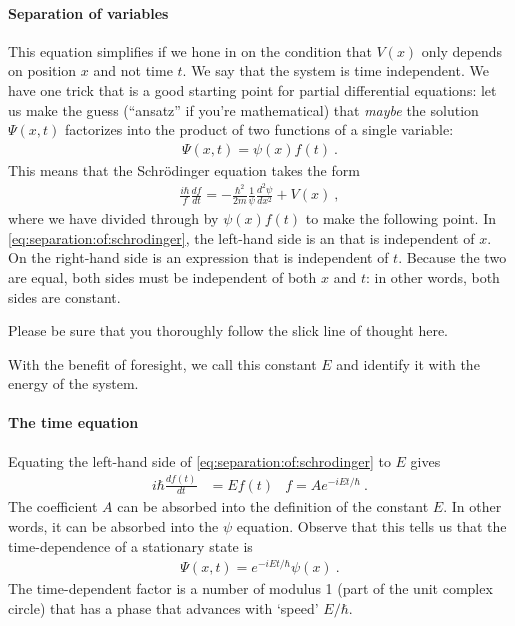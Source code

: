 \documentclass[12pt, oneside]{report}    %
\begin{document}
\paragraph{Separation of variables} This equation simplifies if we hone in on the condition that $V(x)$ only depends on position $x$ and not time $t$. We say that the system is time independent. We have one trick that is a good starting point for partial differential equations: let us make the guess (``ansatz'' if you're mathematical) that \emph{maybe} the solution $\Psi(x,t)$ factorizes into the product of two functions of a single variable:
\begin{align}
    \Psi(x,t) = \psi(x) f(t) \ .
\end{align}
This means that the Schr\"odinger equation takes the form
\begin{align}
    \frac{i\hbar}{f}\frac{df}{dt} = -\frac{\hbar^2}{2m} \frac{1}{\psi}\frac{d^2\psi}{dx^2} + V(x) \ ,
    \label{eq:separation:of:schrodinger}
\end{align}
where we have divided through by  $\psi(x)f(t)$ to make the following point. In \eqref{eq:separation:of:schrodinger}, the left-hand side is an that is independent of $x$. On the right-hand side is an expression that is independent of $t$. Because the two are equal, both sides must be independent of both $x$ and $t$: in other words, both sides are constant. 
\begin{bigidea}
Please be sure that you thoroughly follow the slick line of thought here. 
\end{bigidea}
With the benefit of foresight, we call this constant $E$ and identify it with the energy of the system. 

\paragraph{The time equation} Equating the left-hand side of \eqref{eq:separation:of:schrodinger} to $E$ gives
\begin{align}
    i\hbar \frac{df(t)}{dt} &= E f(t)
    &
    f = A e^{-iEt/\hbar} \ .
    \label{eq:TISE:infinite:f}
\end{align}
The coefficient $A$ can be absorbed into the definition of the constant $E$. In other words, it can be absorbed into the $\psi$ equation. Observe that this tells us that the time-dependence of a stationary state is
\begin{align}
    \Psi(x,t) = e^{-iEt/\hbar} \psi(x) \ .
\end{align}
The time-dependent factor is a number of modulus 1 (part of the unit complex circle) that has a phase that advances with `speed' $E/\hbar$. 
\end{document}
